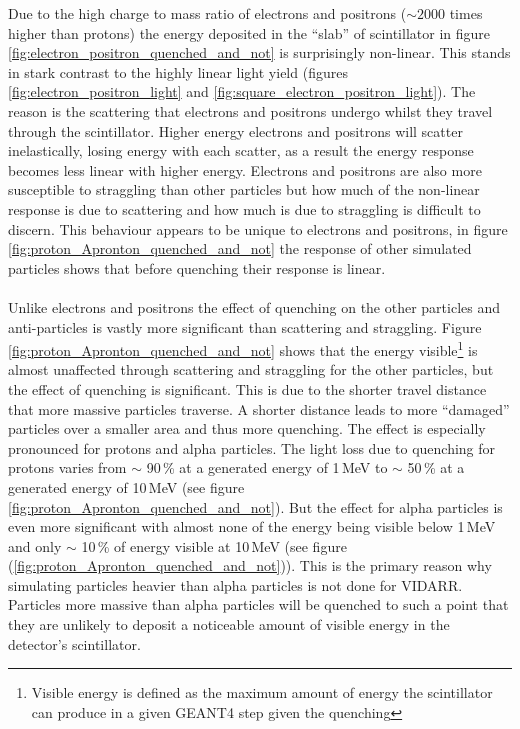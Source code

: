 Due to the high charge to mass ratio of electrons and positrons ($\sim 2000$ times higher than protons) the energy deposited in the ``slab'' of scintillator in figure \ref{fig:electron_positron_quenched_and_not} is surprisingly non-linear. This stands in stark contrast to the highly linear light yield (figures \ref{fig:electron_positron_light} and \ref{fig:square_electron_positron_light}). The reason is the scattering that electrons and positrons undergo whilst they travel through the scintillator. Higher energy electrons and positrons will scatter inelastically, losing energy with each scatter, as a result the energy response becomes less linear with higher energy. Electrons and positrons are also more susceptible to straggling than other particles but how much of the non-linear response is due to scattering and how much is due to straggling is difficult to discern. This behaviour appears to be unique to electrons and positrons, in figure \ref{fig:proton_Apronton_quenched_and_not} the response of other simulated particles shows that before quenching their response is linear. 
\\\\Unlike electrons and positrons the effect of quenching on the other particles and anti-particles is vastly more significant than scattering and straggling. Figure \ref{fig:proton_Apronton_quenched_and_not} shows that the energy visible\footnote{Visible energy is defined as the maximum amount of energy the scintillator can produce in a given GEANT4 step given the quenching} is almost unaffected through scattering and straggling for the other particles, but the effect of quenching is significant. This is due to the shorter travel distance that more massive particles traverse. A shorter distance leads to more ``damaged'' particles over a smaller area and thus more quenching. The effect is especially pronounced for protons and alpha particles. The light loss due to quenching for protons varies from $\sim$ 90\,\% at a generated energy of 1\,MeV to $\sim$ 50\,\% at a generated energy of 10\,MeV (see figure \ref{fig:proton_Apronton_quenched_and_not}). But the effect for alpha particles is even more significant with almost none of the energy being visible below 1\,MeV and only $\sim$ 10\,\% of energy visible at 10\,MeV (see figure (\ref{fig:proton_Apronton_quenched_and_not})). This is the primary reason why simulating particles heavier than alpha particles is not done for VIDARR. Particles more massive than alpha particles will be quenched to such a point that they are unlikely to deposit a noticeable amount of visible energy in the detector's scintillator. 


